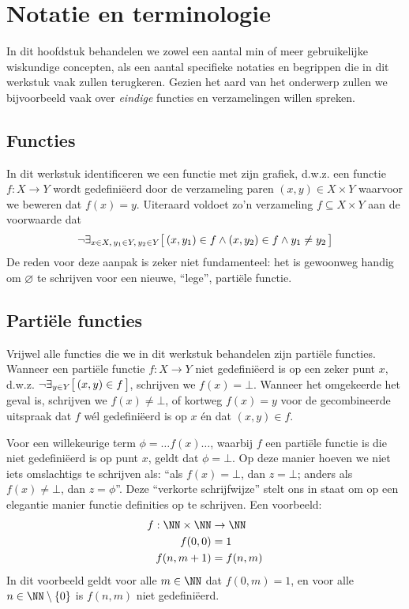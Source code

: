 \chapter{Notatie en terminologie}

In dit hoofdstuk behandelen we zowel een aantal min of meer%
gebruikelijke wiskundige concepten, als een aantal specifieke notaties en begrippen die in dit werkstuk vaak zullen terugkeren. Gezien het aard van het onderwerp zullen we bijvoorbeeld vaak over \emph{eindige} functies en verzamelingen willen%
spreken.

\section{Functies}

In dit werkstuk identificeren we een functie met zijn grafiek, d.w.z.%
een functie $f : X \to Y$ wordt gedefiniëerd door de verzameling paren $(x, y) \in X \times Y$ waarvoor we beweren dat $f(x) = y$. Uiteraard voldoet zo'n verzameling $f \subseteq X \times Y$ aan de voorwaarde dat
\begin{equation*}%
\neg \exists_{x \in X,\, y_1 \in Y,\, y_2 \in Y} \surr{ (x, y_1) \in f \land (x, y_2) \in f \land y_1 \neq y_2 }%
\end{equation*}
De reden voor deze aanpak is zeker niet fundamenteel: het is gewoonweg handig om $\varnothing$ te schrijven voor een nieuwe, ``lege'', partiële functie.

\section{Partiële functies}

Vrijwel alle functies die we in dit werkstuk behandelen zijn partiële functies. Wanneer een partiële functie $f : X \to Y$ niet gedefiniëerd is op een zeker punt $x$, d.w.z.%
$\neg \exists_{y \in Y} \big[\, (x, y) \in f \,\big]$, schrijven we $f(x) = \bot$. Wanneer het omgekeerde het geval is, schrijven we $f(x) \neq \bot$, of kortweg $f(x) = y$ voor de gecombineerde uitspraak dat $f$ wél gedefiniëerd is op $x$ én dat $(x, y) \in f$.

Voor een willekeurige term $\phi = \dots f(x)\dots$, waarbij $f$ een partiële functie is die niet gedefiniëerd is op punt $x$, geldt%
dat $\phi = \bot$. Op deze manier hoeven we niet iets omslachtigs te schrijven als:%
``als $f(x) = \bot$, dan $z = \bot$; anders als $f(x) \neq \bot$, dan $z = \phi$''. Deze ``verkorte schrijfwijze'' stelt ons in staat om op een elegantie manier functie definities op te schrijven. Een voorbeeld:
\begin{align*}
  f : \NN \times \NN &\to \NN \\
  f(0, 0) &= 1 \\
  f(n, m + 1) &= f(n, m)
\end{align*}
In dit voorbeeld geldt voor alle $m \in \NN$ dat $f(0, m) = 1$, en%
voor alle $n \in \NN \setminus \{0\}$ is $f(n, m)$ niet gedefiniëerd.

